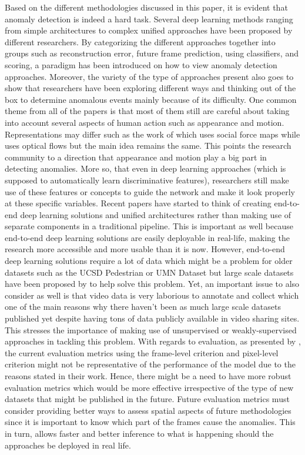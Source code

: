 Based on the different methodologies discussed in this paper, it is evident that anomaly detection is indeed a hard task. Several deep learning methods ranging from simple architectures to complex unified approaches have been proposed by different researchers. By categorizing the different approaches together into groups such as reconstruction error, future frame prediction, using classifiers, and scoring, a paradigm has been introduced on how to view anomaly detection approaches. Moreover, the variety of the type of approaches present also goes to show that researchers have been exploring different ways and thinking out of the box to determine anomalous events mainly because of its difficulty.
One common theme from all of the papers is that most of them still are careful about taking into account several aspects of human action such as appearance and motion. Representations may differ such as the work of  which uses social force maps while  uses optical flows but the main idea remains the same. This points the research community to a direction that appearance and motion play a big part in detecting anomalies. More so, that even in deep learning approaches (which is supposed to automatically learn discriminative features), researchers still make use of these features or concepts to guide the network and make it look properly at these specific variables.
Recent papers have started to think of creating end-to-end deep learning solutions and unified architectures rather than making use of separate components in a traditional pipeline. This is important as well because end-to-end deep learning solutions are easily deployable in real-life, making the research more accessible and more usable than it is now. However, end-to-end deep learning solutions require a lot of data which might be a problem for older datasets such as the UCSD Pedestrian or UMN Dataset but large scale datasets have been proposed by  to help solve this problem. Yet, an important issue to also consider as well is that video data is very laborious to annotate and collect which one of the main reasons why there haven't been as much large scale datasets published yet despite having tons of data publicly available in video sharing sites. This stresses the importance of making use of unsupervised or weakly-supervised approaches in tackling this problem.
With regards to evaluation, as presented by , the current evaluation metrics using the frame-level criterion and pixel-level criterion might not be representative of the performance of the model due to the reasons stated in their work. Hence, there might be a need to have more robust evaluation metrics which would be more effective irrespective of the type of new datasets that might be published in the future. Future evaluation metrics must consider providing better ways to assess spatial aspects of future methodologies since it is important to know which part of the frames cause the anomalies. This in turn, allows faster and better inference to what is happening should the approaches be deployed in real life.
